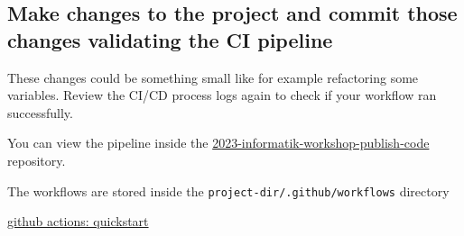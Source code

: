 \documentclass[paper=a4]{scrartcl}
\begin{document}
	\subsection*{Make changes to the project and commit those changes validating the CI pipeline}
		These changes could be something small like for example refactoring some variables. Review the CI/CD process logs again to check if your workflow ran successfully. 
		
	\begin{hints}
		\item You can view the pipeline inside the \href{https://github.com/marc-philipp-knechtle/2023-informatik-workshop-publish-code}{2023-informatik-workshop-publish-code} repository. 
		\item The workflows are stored inside the \texttt{project-dir/.github/workflows} directory
	\end{hints}
	
	\begin{literature}
		\item \href{https://docs.github.com/en/actions/quickstart}{github actions: quickstart}
	\end{literature}




\end{document}
